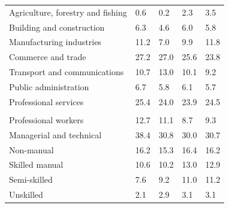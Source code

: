 \documentclass{article}
\begin{document}
\begin{table}[h]
\begin{tabular}{KTTTT}
    \hline
Agriculture, forestry and fishing  & 0.6& 0.2& 2.3& 3.5\\
Building and construction & 6.3& 4.6& 6.0& 5.8\\
Manufacturing industries & 11.2&  7.0&  9.9& 11.8\\
Commerce and trade  & 27.2& 27.0& 25.6& 23.8\\
Transport and communications  & 10.7& 13.0& 10.1&  9.2\\
Public administration & 6.7& 5.8& 6.1& 5.7\\
Professional services & 25.4& 24.0& 23.9& 24.5\\
\hline
    \\ 
    \hline
Professional workers  & 12.7& 11.1 &  8.7&  9.3\\
Managerial and technical & 38.4& 30.8& 30.0& 30.7\\
Non-manual & 16.2& 15.3& 16.4& 16.2\\
Skilled manual & 10.6& 10.2& 13.0& 12.9\\
Semi-skilled &  7.6&  9.2& 11.0& 11.2\\
Unskilled  & 2.1& 2.9& 3.1& 3.1\\
\end{tabular}
\end{table}
\pagebreak
\end{document}
